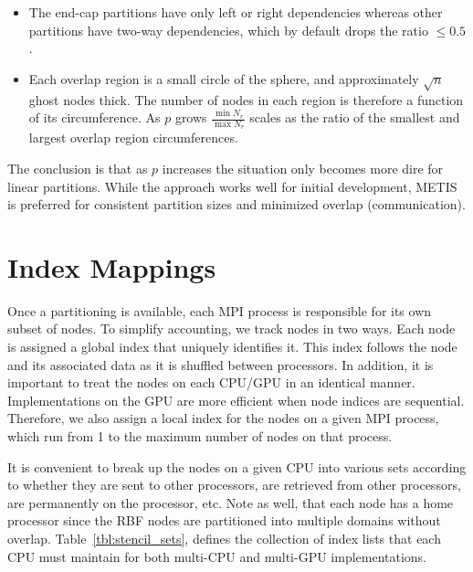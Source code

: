 \documentclass{report}
\begin{document}
\begin{itemize} 
\item The end-cap partitions have only left or right dependencies whereas other partitions have two-way dependencies, which by default drops the ratio $\leq 0.5$. 
\item Each overlap region is a small circle of the sphere, and approximately $\sqrt{n}$ ghost nodes thick. The number of nodes in each region is therefore a function of its circumference. As $p$ grows $\frac{\min N_r}{\max N_r}$ scales as the ratio of the smallest and largest overlap region circumferences.
\end{itemize}
The conclusion is that as $p$ increases the situation only becomes more dire for linear partitions. While the approach works well for initial development, METIS is preferred for consistent partition sizes and minimized overlap (communication).

% 


\section{Index Mappings}

Once a partitioning is available, each MPI process is responsible for its own subset of nodes. 
To simplify accounting, we track nodes in two ways. Each node is assigned
a global index that uniquely identifies it. This index follows the node 
and its associated data as it is shuffled between processors. In addition, 
it is important to treat the nodes on each CPU/GPU in an identical manner. 
Implementations on the GPU are more efficient when node indices
are sequential. Therefore, we also assign a local index for the nodes on 
a given MPI process, which run from 1 to the maximum number of nodes on that process. 


It is convenient to break up the nodes on a given CPU into various sets
according to whether they are sent to other processors, are retrieved from 
other processors, are permanently on the processor, etc. Note as well, 
that each node has a home processor since the RBF nodes are partitioned into 
multiple domains without overlap.
Table~\ref{tbl:stencil_sets}, defines the collection of index lists that each CPU must maintain for both multi-CPU and multi-GPU implementations.  
\end{document}

